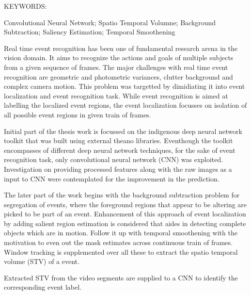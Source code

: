 \abstract

\noindent KEYWORDS: \hspace*{0.5em} \parbox[t]{4.4in}{Convolutional Neural Network; Spatio Temporal Volumne; Background Subtraction; Saliency Estimation; Temporal Smoothening}

\vspace*{24pt}
Real time event recognition has been one of fundamental research arena in the vision domain. It aims to recognize the actions and goals of multiple subjects from a given sequence of frames. The major challenges with real time event recognition are geometric and photometric variances, clutter background and complex camera motion. This problem was targetted  by dimidiating it into event localization and event recognition task. While event recognition is aimed at labelling the localized event regions, the event localization focusses on isolation of all possible event regions in given train of frames.

\par Initial part of the thesis work is focussed on the indigenous deep neural network toolkit that was built using external theano libraries. Eventhough the toolkit encompasses of different deep neural network techniques, for the sake of event recognition task, only convolutional neural network (CNN) was exploited. Investigation on providing  processed features along with the raw images as a input to CNN were contemplated for the improvement in the prediction.

\par The later part of the work begins with the background subtraction problem for segregation of events, where the foreground regions that appear to be altering are picked to be part of an event. Enhancement of this approach of event localization by adding salient region estimation is considered that aides in detecting complete objects which are in motion. Follow it up with temporal smoothening with the motivation to even out the mask estimates across continuous train of frames. Window tracking is supplemented over all these to extract the spatio temporal volume (STV) of a event.
 
\par Extracted STV from the video segments are supplied to a  CNN to identify the corresponding event label.
\pagebreak